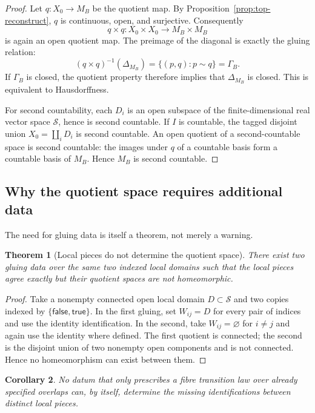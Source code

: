 \documentclass[11pt,a4paper]{article}
\newtheorem{theorem}{Theorem}[section]
\newtheorem{corollary}[theorem]{Corollary}
\theoremstyle{definition}
\theoremstyle{remark}
\newcommand{\Smodel}{\mathcal{S}}
\begin{document}
\begin{proof}
Let \(q:X_0\to M_B\) be the quotient map.  By
Proposition~\ref{prop:top-reconstruct}, \(q\) is continuous, open, and surjective.
Consequently
\[
   q\times q:X_0\times X_0\longrightarrow M_B\times M_B
\]
is again an open quotient map.  The preimage of the diagonal is exactly the
gluing relation:
\[
   (q\times q)^{-1}(\Delta_{M_B})
   =\{(p,q):p\sim q\}
   =\Gamma_B.
\]
If \(\Gamma_B\) is closed, the quotient property therefore implies that
\(\Delta_{M_B}\) is closed.  This is equivalent to Hausdorffness.

For second countability, each \(D_i\) is an open subspace of the
finite-dimensional real vector space \(\Smodel\), hence is second
countable.  If \(I\) is countable, the tagged disjoint union
\(X_0=\coprod_i D_i\) is second countable.  An open quotient of a
second-countable space is second countable: the images under \(q\) of a
countable basis form a countable basis of \(M_B\).  Hence \(M_B\) is second
countable.
\end{proof}

\subsection{Why the quotient space requires additional data}

The need for gluing data is itself a theorem, not merely a warning.

\begin{theorem}[Local pieces do not determine the quotient space]
\label{thm:base-nonderivability}
There exist two gluing data over the same two indexed local domains
such that the local pieces agree exactly but their quotient spaces are not
homeomorphic.
\end{theorem}

\begin{proof}
Take a nonempty connected open local domain \(D\subset\Smodel\) and two
copies indexed by \(\{\mathsf{false},\mathsf{true}\}\).  In the first
gluing, set \(W_{ij}=D\) for every pair of indices and use the identity
identification.  In the second, take \(W_{ij}=\varnothing\) for \(i\neq j\)
and again use the identity where defined.  The first quotient is connected;
the second is the disjoint union of two nonempty open components and is not
connected.  Hence no homeomorphism can exist between them.
\end{proof}

\begin{corollary}
\label{cor:fibre-not-base}
No datum that only prescribes a fibre transition law over already specified
overlaps can, by itself, determine the missing identifications between distinct
local pieces.
\end{corollary}
\end{document}
